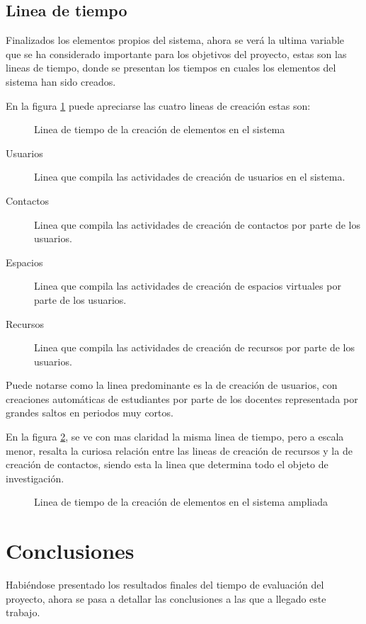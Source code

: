 \subsection{Linea de tiempo}
Finalizados los elementos propios del sistema, ahora se verá la ultima variable
que se ha considerado importante para los objetivos del proyecto, estas son las
lineas de tiempo, donde se presentan los tiempos en cuales los elementos del
sistema han sido creados.

En la figura \ref{tiempos_area_1} puede apreciarse las cuatro lineas de creación
estas son:

\begin{figure}
\centering

\caption{Linea de tiempo de la creación de elementos en el sistema}
\label{tiempos_area_1}
\end{figure}

\begin{description}
\item [Usuarios] Linea que compila las actividades de creación de usuarios en el
sistema.
\item [Contactos] Linea que compila las actividades de creación de contactos por
parte de los usuarios.
\item [Espacios] Linea que compila las actividades de creación de espacios
virtuales por parte de los usuarios.
\item [Recursos] Linea que compila las actividades de creación de recursos por
parte de los usuarios.
\end{description}

Puede notarse como la linea predominante es la de creación de usuarios, con
creaciones automáticas de estudiantes por parte de los docentes representada por
grandes saltos en periodos muy cortos.

En la figura \ref{tiempos_area_2}, se ve con mas claridad la misma linea de
tiempo, pero a escala menor, resalta la curiosa relación entre las lineas
de creación de recursos y la de creación de contactos, siendo esta la linea que
determina todo el objeto de investigación.

\begin{figure}
\centering

\caption{Linea de tiempo de la creación de elementos en el sistema ampliada}
\label{tiempos_area_2}
\end{figure}

\section{Conclusiones}
Habiéndose presentado los resultados finales del tiempo de evaluación del
proyecto, ahora se pasa a detallar las conclusiones a las que a llegado este
trabajo.

